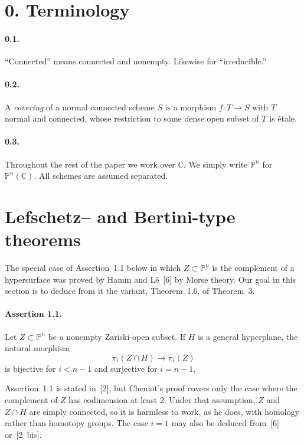 \documentclass[11pt]{amsart}
\newcommand{\PP}{\mathbb{P}}
\newcommand{\CC}{\mathbb{C}}
\begin{document}
\section*{0. Terminology}

\paragraph{\textbf{0.1.}}
``Connected'' means connected and nonempty. Likewise for ``irreducible.''

\paragraph{\textbf{0.2.}}
A \emph{covering} of a normal connected scheme $S$ is a morphism $f\colon T\to S$ with $T$ normal and connected, whose restriction to some dense open subset of $T$ is \'etale.

\paragraph{\textbf{0.3.}}
Throughout the rest of the paper we work over $\CC$. We simply write $\PP^n$ for $\PP^n(\CC)$. All schemes are assumed separated.

\section{Lefschetz-- and Bertini-type theorems}

The special case of Assertion~1.1 below in which $Z\subset \PP^n$ is the complement of a hypersurface was proved by Hamm and L\^e~[6] by Morse theory. Our goal in this section is to deduce from it the variant, Theorem~1.6, of Theorem~3.

\paragraph{\textbf{Assertion 1.1.}}
Let $Z\subset \PP^n$ be a nonempty Zariski-open subset. If $H$ is a general hyperplane, the natural morphism
\[
\pi_i(Z\cap H)\to \pi_i(Z)
\]
is bijective for $i<n-1$ and surjective for $i=n-1$.

Assertion~1.1 is stated in~[2], but Cheniot's proof covers only the case where the complement of $Z$ has codimension at least $2$. Under that assumption, $Z$ and $Z\cap H$ are simply connected, so it is harmless to work, as he does, with homology rather than homotopy groups. The case $i=1$ may also be deduced from~[6] or~[2~bis].
\end{document}
